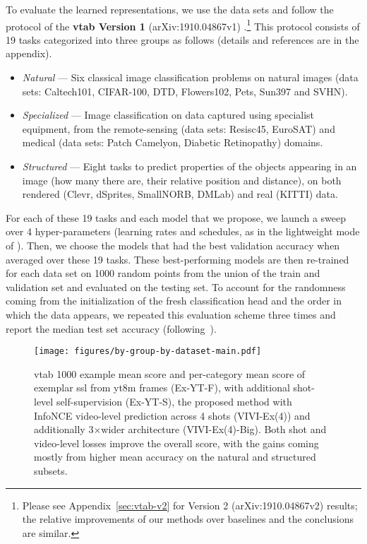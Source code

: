 \documentclass[10pt,twocolumn,letterpaper]{article}
\renewcommand{\paragraph}[1]{\noindent{\bf #1}\quad}
\begin{document}
\paragraph{Downstream evaluation}
To evaluate the learned representations, we use the data sets and follow the protocol of the {\bf \gls{vtab} Version 1} (arXiv:1910.04867v1) \cite{zhai2019visual}.\footnote{Please see Appendix~\ref{sec:vtab-v2} for Version 2 (arXiv:1910.04867v2) results; the relative improvements of our methods over baselines and the conclusions are similar.}
This protocol consists of 19 tasks categorized into three groups as follows (details and references are in the appendix).
\begin{itemize}[itemsep=2pt,parsep=2pt]
    \item \emph{Natural} --- Six classical image classification problems on natural images (data sets: Caltech101, CIFAR-100, DTD, Flowers102, Pets, Sun397 and SVHN).
    \item \emph{Specialized} --- Image classification on data captured using specialist equipment, from the remote-sensing (data sets: Resisc45, EuroSAT) and medical (data sets: Patch Camelyon, Diabetic Retinopathy) domains.
    \item \emph{Structured} --- Eight tasks to predict properties of the objects appearing in an image (how many there are, their relative position and distance), on both rendered (Clevr, dSprites, SmallNORB, DMLab) and real (KITTI) data.
\end{itemize}


For each of these 19 tasks and each model that we propose, we launch a sweep over 4 hyper-parameters (learning rates and schedules, as in the lightweight mode of \cite{zhai2019visual}).
Then, we choose the models that had the best validation accuracy when averaged over these 19 tasks.
These best-performing models are then re-trained for each data set on 1000 random points from the union of the train and validation set and evaluated on the testing set.
To account for the randomness coming from the initialization of the fresh classification head and the order in which the data appears, we repeated this evaluation scheme three times and report the median test set accuracy (following~\cite{zhai2019visual}).

\begin{figure*}[t!]
\centering
\texttt{[image: figures/by-group-by-dataset-main.pdf]}
\vspace{-0.2cm}
\caption{\gls{vtab} 1000 example mean score and per-category mean score of exemplar \gls{ssl} from \gls{yt8m} frames (Ex-YT-F), with additional shot-level self-supervision (Ex-YT-S), the proposed method with InfoNCE video-level prediction across 4 shots (VIVI-Ex(4)) and additionally 3$\times$wider architecture (VIVI-Ex(4)-Big). Both shot and video-level losses improve the overall score, with the gains coming mostly from higher mean accuracy on the natural and structured subsets.}
\vspace{-0.2cm}
\label{fig:pure-ssl}
\end{figure*}
\end{document}
